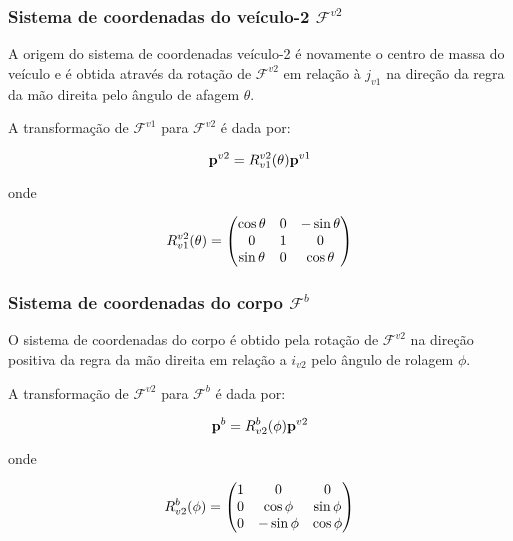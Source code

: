 \documentclass[a4paper, 12pt]{article}
\begin{document}
\subsubsection{Sistema de coordenadas do veículo-2 $\mathcal{F}^{v2}$}

A origem do sistema de coordenadas veículo-2 é novamente o centro de massa do veículo e é obtida através da rotação de $\mathcal{F}^{v2}$ em relação à $j_{v1}$ na direção da regra da mão direita pelo ângulo de afagem $\theta$. 

A transformação de $\mathcal{F}^{v1}$ para $\mathcal{F}^{v2}$ é dada por:

\begin{equation}
\centering
\mathbf{p}^{v2} = { R }_{ v1 }^{ v2 }(\theta)\mathbf{p}^{v1}
\label{eq:coord2}
\end{equation}

\noindent onde

\begin{equation}
\centering
{ R }_{ v1 }^{ v2 }(\theta) = 
\begin{pmatrix} 
	\cos {\theta}  & 0 & -\sin {\theta} \\
	0  & 1 & 0 \\
	\sin {\theta}  & 0 & \cos  {\theta}	 
\end{pmatrix}
\label{eq:rotafagem}
\end{equation}

\subsubsection{Sistema de coordenadas do corpo $\mathcal{F}^{b}$}

O sistema de coordenadas do corpo é obtido pela rotação de $\mathcal{F}^{v2}$ na direção positiva da regra da mão direita em relação a $i_{v2}$ pelo ângulo de rolagem $\phi$. 

A transformação de $\mathcal{F}^{v2}$ para $\mathcal{F}^{b}$ é dada por:

\begin{equation}
\centering
\mathbf{p}^{b} = { R }_{ v2 }^{ b }(\phi)\mathbf{p}^{v2}
\label{eq:coord3}
\end{equation}

\noindent onde

\begin{equation}
\centering
{ R }_{ v2 }^{ b }(\phi) = 
\begin{pmatrix} 
	1  & 0 & 0 \\
	0 & \cos {\phi}  &  \sin {\phi} \\
	0 & -\sin {\phi}  & \cos {\phi}	 
\end{pmatrix}
\label{eq:rotrolagem}
\end{equation}
\end{document}
